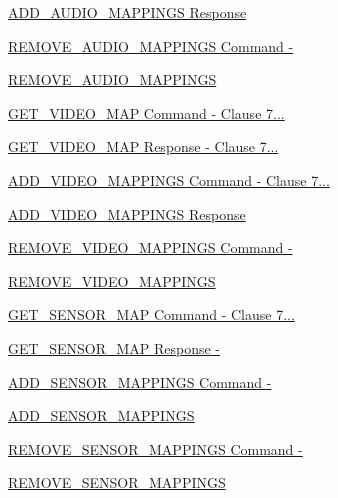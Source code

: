 \begin{DoxyCompactItemize}
\item 
\hyperlink{group__command__add__audio__mappings__response}{A\+D\+D\+\_\+\+A\+U\+D\+I\+O\+\_\+\+M\+A\+P\+P\+I\+N\+G\+S Response}
\item 
\hyperlink{group__command__remove__audio__mappings}{R\+E\+M\+O\+V\+E\+\_\+\+A\+U\+D\+I\+O\+\_\+\+M\+A\+P\+P\+I\+N\+G\+S Command  -\/}
\item 
\hyperlink{group__command__remove__audio__mappings__response}{R\+E\+M\+O\+V\+E\+\_\+\+A\+U\+D\+I\+O\+\_\+\+M\+A\+P\+P\+I\+N\+GS}
\item 
\hyperlink{group__command__get__video__map}{G\+E\+T\+\_\+\+V\+I\+D\+E\+O\+\_\+\+M\+A\+P Command  -\/ Clause 7...}
\item 
\hyperlink{group__command__get__video__map__response}{G\+E\+T\+\_\+\+V\+I\+D\+E\+O\+\_\+\+M\+A\+P Response  -\/ Clause 7...}
\item 
\hyperlink{group__command__add__video__mappings}{A\+D\+D\+\_\+\+V\+I\+D\+E\+O\+\_\+\+M\+A\+P\+P\+I\+N\+G\+S Command  -\/ Clause 7...}
\item 
\hyperlink{group__command__add__video__mappings__response}{A\+D\+D\+\_\+\+V\+I\+D\+E\+O\+\_\+\+M\+A\+P\+P\+I\+N\+G\+S Response}
\item 
\hyperlink{group__command__remove__video__mappings}{R\+E\+M\+O\+V\+E\+\_\+\+V\+I\+D\+E\+O\+\_\+\+M\+A\+P\+P\+I\+N\+G\+S Command  -\/}
\item 
\hyperlink{group__command__remove__video__mappings__response}{R\+E\+M\+O\+V\+E\+\_\+\+V\+I\+D\+E\+O\+\_\+\+M\+A\+P\+P\+I\+N\+GS}
\item 
\hyperlink{group__command__get__sensor__map}{G\+E\+T\+\_\+\+S\+E\+N\+S\+O\+R\+\_\+\+M\+A\+P Command  -\/ Clause 7...}
\item 
\hyperlink{group__command__get__sensor__map__response}{G\+E\+T\+\_\+\+S\+E\+N\+S\+O\+R\+\_\+\+M\+A\+P Response  -\/}
\item 
\hyperlink{group__command__add__sensor__mappings}{A\+D\+D\+\_\+\+S\+E\+N\+S\+O\+R\+\_\+\+M\+A\+P\+P\+I\+N\+G\+S Command  -\/}
\item 
\hyperlink{group__command__add__sensor__mappings__response}{A\+D\+D\+\_\+\+S\+E\+N\+S\+O\+R\+\_\+\+M\+A\+P\+P\+I\+N\+GS}
\item 
\hyperlink{group__command__remove__sensor__mappings}{R\+E\+M\+O\+V\+E\+\_\+\+S\+E\+N\+S\+O\+R\+\_\+\+M\+A\+P\+P\+I\+N\+G\+S Command  -\/}
\item 
\hyperlink{group__command__remove__sensor__mappings__response}{R\+E\+M\+O\+V\+E\+\_\+\+S\+E\+N\+S\+O\+R\+\_\+\+M\+A\+P\+P\+I\+N\+GS}

\end{DoxyCompactItemize}
